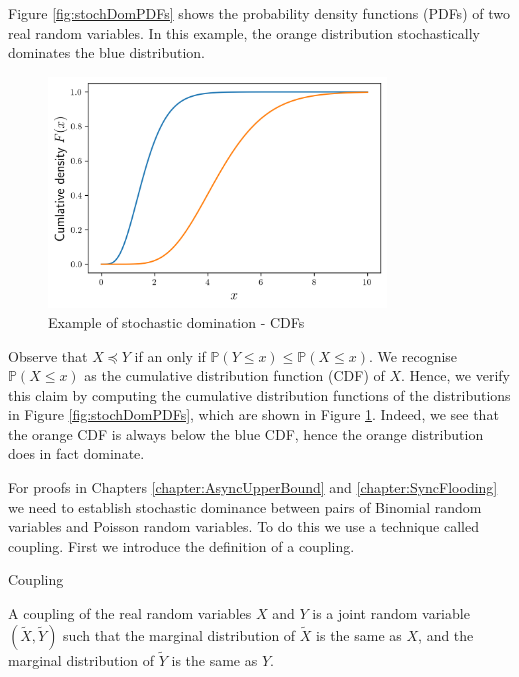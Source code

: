 Figure \ref{fig:stochDomPDFs} shows the probability density functions (PDFs) of two real random variables. In this example, the orange distribution stochastically dominates the blue distribution.

\begin{figure}[h]
	\centering
	\includegraphics[width=0.8\textwidth]{./figures/stochastic_domination_cdf.png}
	\caption{Example of stochastic domination - CDFs}
	\label{fig:stochDomCDFs}
\end{figure}

Observe that $X \preceq Y$ if an only if $\mathbb{P}(Y \leq x) \leq \mathbb{P}(X \leq x)$. We recognise $\mathbb{P}(X \leq x)$ as the cumulative distribution function (CDF) of $X$. Hence, we verify this claim by computing the cumulative  distribution functions of the distributions in Figure \ref{fig:stochDomPDFs}, which are shown in Figure \ref{fig:stochDomCDFs}. Indeed, we see that the orange CDF is always below the blue CDF, hence the orange distribution does in fact dominate. %

For proofs in Chapters \ref{chapter:AsyncUpperBound} and \ref{chapter:SyncFlooding} we need to establish stochastic dominance between pairs of Binomial random variables and Poisson random variables. To do this we use a technique called coupling. First we introduce the definition of a coupling.

\begin{definition} %
	Coupling

	\noindent
	A  coupling of the real random variables $X$ and $Y$ is a joint random variable $(\tilde{X}, \tilde{Y})$ such that the marginal distribution of $\tilde{X}$ is the same as $X$, and the marginal distribution of $\tilde{Y}$ is the same as $Y$.
\end{definition}

